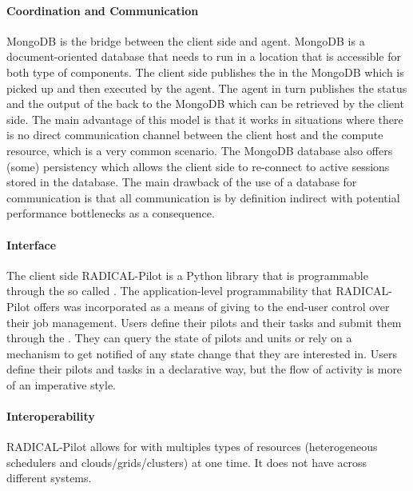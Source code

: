 \documentclass{sig-alternate}
\begin{document}
\paragraph{Coordination and Communication}

MongoDB is the bridge between the client side and agent. MongoDB is a
document-oriented database that needs to run in a location that is accessible
for both type of components. The client side publishes the  in
the MongoDB which is picked up and then executed by the agent. The agent in
turn publishes the status and the output of the  back to
the MongoDB which can be retrieved by the client side. The main advantage of
this model is that it works in situations where there is no direct
communication channel between the client host and the compute resource, which
is a very common scenario. The MongoDB database also offers (some) persistency
which allows the client side to re-connect to active sessions stored in the
database. The main drawback of the use of a database for communication is that
all communication is by definition indirect with potential performance
bottlenecks as a consequence.

\paragraph{Interface}

The client side RADICAL-Pilot is a Python library that is programmable through
the so called . The application-level programmability that
RADICAL-Pilot offers was incorporated as a means of giving to the end-user
control over their job management. Users define their pilots and their tasks
and submit them through the . They can query the state of
pilots and units or rely on a  mechanism to get notified of
any state change that they are interested in. Users define their pilots and
tasks in a declarative way, but the flow of activity is more of an imperative
style.

\paragraph{Interoperability}

RADICAL-Pilot allows for  with multiples types of
resources (heterogeneous schedulers and clouds/grids/clusters) at one time. It
does not have  across different \pilot systems.
\end{document}
